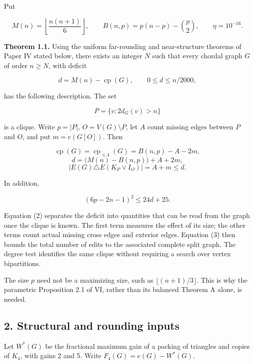 \documentclass[english,11pt,a4paper]{article}
\begin{document}
Put

\[
M(n)=\left\lfloor\frac{n(n+1)}6\right\rfloor,
\qquad B(n,p)=p(n-p)-\binom p2,
\qquad \eta=10^{-16}.
\]

\textbf{Theorem 1.1.} Using the uniform far-rounding and near-structure
theorems of Paper IV stated below, there exists an integer \(N\) such
that every chordal graph \(G\) of order \(n\ge N\), with deficit

\[
d=M(n)-\operatorname{cp}(G),\qquad 0\le d\le n/2000,
\]

has the following description. The set

\[
P=\{v:2d_G(v)>n\}
\]

is a clique. Write \(p=|P|\), \(O=V(G)\setminus P\), let \(A\) count
missing edges between \(P\) and \(O\), and put \(m=e(G[O])\). Then

\[
\boxed{\operatorname{cp}(G)=\operatorname{cp}_{\le4}(G)
=B(n,p)-A-2m,}
\tag{1}
\] \[
\boxed{d=\bigl(M(n)-B(n,p)\bigr)+A+2m,}
\tag{2}
\] \[
\boxed{|E(G)\triangle E(K_P\vee I_O)|=A+m\le d.}
\tag{3}
\]

In addition,

\[
(6p-2n-1)^2\le24d+25.
\tag{4}
\]

Equation (2) separates the deficit into quantities that can be read from
the graph once the clique is known. The first term measures the effect
of its size; the other terms count actual missing cross edges and
exterior edges. Equation (3) then bounds the total number of edits to
the associated complete split graph. The degree test identifies the same
clique without requiring a search over vertex bipartitions.

The size \(p\) need not be a maximizing size, such as
\(\lfloor(n+1)/3\rfloor\). This is why the parametric Proposition 2.1 of
VI, rather than its balanced Theorem A alone, is needed.

\subsection{2. Structural and rounding
inputs}\label{structural-and-rounding-inputs}

Let \(W^*(G)\) be the fractional maximum gain of a packing of triangles
and copies of \(K_4\), with gains 2 and 5. Write \(F_4(G)=e(G)-W^*(G)\).
\end{document}
